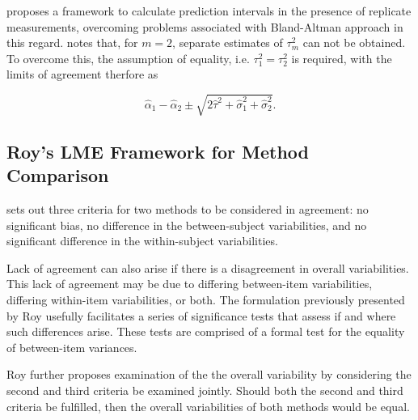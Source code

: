 \documentclass[12pt, a4paper]{report}
\theoremstyle{plain}
\theoremstyle{definition}
\theoremstyle{remark}
\begin{document}
\citet{BXC2008} proposes a framework to calculate prediction intervals in the presence of replicate measurements, overcoming problems associated with Bland-Altman approach in this regard. \citet{BXC2008} notes that, for $m=2$, separate estimates of $\tau^2_m$ can not be obtained. To overcome this, the assumption of equality, i.e. $\tau^2_1 = \tau^2_2$ is required, with the limits of agreement therfore
	as
	
	\[
	\hat{\alpha}_1 - \hat{\alpha}_2 \pm \sqrt{2 \hat{\tau}^2 +
		\hat{\sigma}^2_1 + \hat{\sigma}^2_2}.
	\]
	
	
	
	
	
	
	
	
	
	\subsection{Roy's LME Framework for Method Comparison }
	\citet{Barnhart} sets out three criteria for two methods to be considered in agreement: no significant bias, no difference in the between-subject variabilities, and no significant difference in the within-subject variabilities. 
	
	
	Lack of agreement can also arise if there is a disagreement in overall variabilities. This lack of agreement may be due to differing between-item variabilities, differing within-item variabilities, or both. The formulation previously presented by Roy usefully facilitates a series of significance tests that assess if and where such differences arise. These tests are comprised of a formal test for the equality of between-item variances. 
	
	Roy further proposes examination of the the overall variability by considering the second and third criteria be examined jointly. Should both the second and third criteria be fulfilled, then the overall variabilities of both methods would be equal.
	
\end{document}
